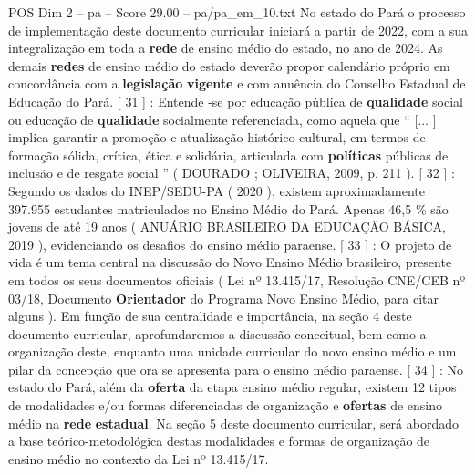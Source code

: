 \begin{textsample}{POS Dim 2 – pa – Score 29.00 – pa/pa\_em\_10.txt}
No estado do Pará o processo de implementação deste documento curricular iniciará a partir de 2022, com a sua integralização em toda a \textbf{rede} de ensino médio do estado, no ano de 2024.
As demais \textbf{redes} de ensino médio do estado deverão propor calendário próprio em concordância com a \textbf{legislação} \textbf{vigente} e com anuência do Conselho Estadual de Educação do Pará. [ 31 ] : Entende -se por educação pública de \textbf{qualidade} social ou educação de \textbf{qualidade} socialmente referenciada, como aquela que “ [... ] implica garantir a promoção e atualização histórico-cultural, em termos de formação sólida, crítica, ética e solidária, articulada com \textbf{políticas} públicas de inclusão e de resgate social ” ( DOURADO ; OLIVEIRA, 2009, p. 211 ). [ 32 ] : Segundo os dados do INEP/SEDU-PA ( 2020 ), existem aproximadamente 397.955 estudantes matriculados no Ensino Médio do Pará.
Apenas 46,5 \% são jovens de até 19 anos ( ANUÁRIO BRASILEIRO DA EDUCAÇÃO BÁSICA, 2019 ), evidenciando os desafios do ensino médio paraense. [ 33 ] : O projeto de vida é um tema central na discussão do Novo Ensino Médio brasileiro, presente em todos os seus documentos oficiais ( Lei nº 13.415/17, Resolução CNE/CEB nº 03/18, Documento \textbf{Orientador} do Programa Novo Ensino Médio, para citar alguns ).
Em função de sua centralidade e importância, na seção 4 deste documento curricular, aprofundaremos a discussão conceitual, bem como a organização deste, enquanto uma unidade curricular do novo ensino médio e um pilar da concepção que ora se apresenta para o ensino médio paraense. [ 34 ] : No estado do Pará, além da \textbf{oferta} da etapa ensino médio regular, existem 12 tipos de modalidades e/ou formas diferenciadas de organização e \textbf{ofertas} de ensino médio na \textbf{rede} \textbf{estadual}.
Na seção 5 deste documento curricular, será abordado a base teórico-metodológica destas modalidades e formas de organização de ensino médio no contexto da Lei nº 13.415/17.

\end{textsample}
